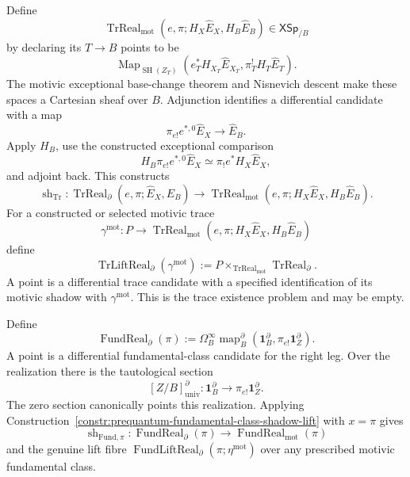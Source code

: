 \begin{construction}
\label{constr:prequantum-coefficient-trace-shadow-lift}
Define
\[
\operatorname{TrReal}_{\mathrm{mot}}
(e,\pi;H_X\widehat E_X,H_B\widehat E_B)
\in\mathsf{XSp}_{/B}
\]
by declaring its $T\to B$ points to be
\[
\operatorname{Map}_{\operatorname{SH}(Z_T)}
\left(e_T^*H_{X_T}\widehat E_{X_T},
      \pi_T^!H_T\widehat E_T\right).
\]
The motivic exceptional base-change theorem and Nisnevich descent make these
spaces a Cartesian sheaf over $B$.
Adjunction identifies a differential candidate with a map
\[
\pi_{e!}e^{*,0}\widehat E_X\longrightarrow\widehat E_B.
\]
Apply $H_B$, use the constructed exceptional comparison
\[
H_B\pi_{e!}e^{*,0}\widehat E_X
\simeq
\pi_!e^*H_X\widehat E_X,
\]
and adjoint back.  This constructs
\[
\operatorname{sh}_{\mathrm{Tr}}:
\operatorname{TrReal}_{\partial}
(e,\pi;\widehat E_X,\widehat E_B)
\longrightarrow
\operatorname{TrReal}_{\mathrm{mot}}
(e,\pi;H_X\widehat E_X,H_B\widehat E_B).
\]
For a constructed or selected motivic trace
\[
\gamma^{\mathrm{mot}}:
P\longrightarrow\operatorname{TrReal}_{\mathrm{mot}}
(e,\pi;H_X\widehat E_X,H_B\widehat E_B)
\]
define
\[
\boxed{
\operatorname{TrLiftReal}_{\partial}(\gamma^{\mathrm{mot}})
:=
P\times_{\operatorname{TrReal}_{\mathrm{mot}}}
\operatorname{TrReal}_{\partial}.
}
\]
A point is a differential trace candidate with a specified identification of its
motivic shadow with $\gamma^{\mathrm{mot}}$.  This is the trace existence problem
and may be empty.
\end{construction}

\begin{definition}
\label{def:prequantum-correspondence-fundamental-class-realization}
Define
\[
\boxed{
\operatorname{FundReal}_{\partial}(\pi)
:=
\Omega_B^\infty
\operatorname{map}^{\partial}_B
\left(\mathbf1_B^{\partial},\pi_{e!}\mathbf1_Z^{\partial}\right).
}
\]
A point is a differential fundamental-class candidate for the right leg.  Over
the realization there is the tautological section
\[
[Z/B]^\partial_{\mathrm{univ}}:
\mathbf1_B^\partial\longrightarrow\pi_{e!}\mathbf1_Z^\partial.
\]
The zero section canonically points this realization.  Applying
Construction~\ref{constr:prequantum-fundamental-class-shadow-lift} with
$x=\pi$ gives
\[
\operatorname{sh}_{\mathrm{Fund},\pi}:
\operatorname{FundReal}_{\partial}(\pi)
\longrightarrow
\operatorname{FundReal}_{\mathrm{mot}}(\pi)
\]
and the genuine lift fibre
$\operatorname{FundLiftReal}_{\partial}(\pi;\eta^{\mathrm{mot}})$ over any
prescribed motivic fundamental class.
\end{definition}

